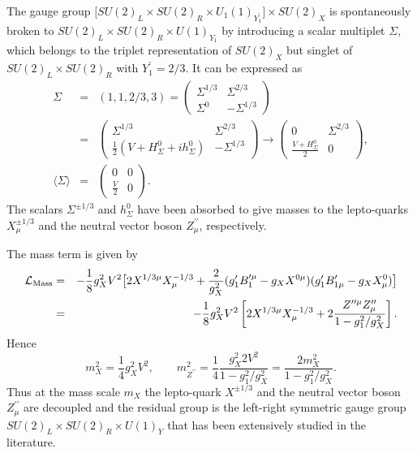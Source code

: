 \documentclass{ws-ijmpa}
\begin{document}
The gauge group $\big[SU(2)_{L}\times SU(2)_{R}\times U_{1}(1)_{Y^{\prime}_{1}}\big]\times SU(2)_{X}$ is spontaneously broken to $SU(2)_{L}\times SU(2)_{R}\times U(1)_{Y_{1}}$ by introducing a scalar multiplet $\Sigma$, which belongs to the triplet representation of $SU(2)_X$ but singlet of $SU(2)_{L}\times SU(2)_{R}$ with $Y^{\prime}_{1} = 2/3$. It can be expressed as
\begin{eqnarray}
\Sigma &=&(1, 1, 2/3, 3) = \left(\begin{array}{cc} \Sigma^{1/3}& \Sigma^{2/3} \\
\Sigma^{0} & -\Sigma^{1/3}\end{array}\right)\nonumber \\
& = &\left(\begin{array}{cc} \Sigma^{1/3}& \Sigma^{2/3} \\
\frac{1}{2}(V+H^{0}_{\Sigma}+ih^{0}_{\Sigma}) & -\Sigma^{1/3}\end{array}\right)\rightarrow \left(\begin{array}{cc} 0 & \Sigma^{2/3} \\
\frac{V+H^{0}_{\Sigma}}{2} & 0\end{array}\right),\nonumber \\
\langle \Sigma \rangle & = & \left(\begin{array}{cc} 0 & 0 \\
\frac{V}{2} & 0\end{array}\right) \label{vev-sigma}.
\end{eqnarray}
The scalars $\Sigma^{\pm 1/3}$ and $h^{0}_{\Sigma}$ have been absorbed to give masses to the lepto-quarks $X^{\pm 1/3}_{\mu}$ and the neutral vector boson $Z^{\prime\prime}_{\mu}$, respectively.

The mass term is given by
\begin{eqnarray}
\mathcal{L}_{\text{Mass}} &=& -\frac{1}{8}g^{2}_{X}V^2\big[2X^{1/3 \mu}X^{-1/3}_{\mu}+\frac{2}{g^{2}_X}(g^{\prime}_1 B_{1}^{\prime \mu} - g_{X}X^{0 \mu})(g^{\prime}_1 B_{1 \mu}^{\prime} - g_{X}X_{\mu}^{0})\big]\notag \\
&=& -\frac{1}{8}g^{2}_{X}V^2\left[2X^{1/3 \mu}X^{-1/3}_{\mu}+2\frac{Z^{\prime\prime \mu}Z^{\prime\prime}_{\mu}}{1-g^2_1/g^2_X}\right]\label{mass-term}.
\end{eqnarray}
Hence
\begin{equation}
m^{2}_{X} = \frac{1}{4}g^2_{X}V^2,\quad\quad m^{2}_{Z^{\prime\prime}} = \frac{1}{4}\frac{g_{X}^2 2V^2}{1-g^{2}_1/g^{2}_X} = \frac{2m^{2}_{X}}{1-g^{2}_1/g^{2}_X}\label{mxmass}.
\end{equation}
Thus at the mass scale $m_X$ the lepto-quark $X^{\pm 1/3}$ and the neutral vector boson $Z^{\prime\prime}_{\mu}$ are decoupled and the residual group is the left-right symmetric gauge group $SU(2)_L \times SU(2)_R\times U(1)_{Y}$ that has been extensively studied in the literature.
\end{document}
